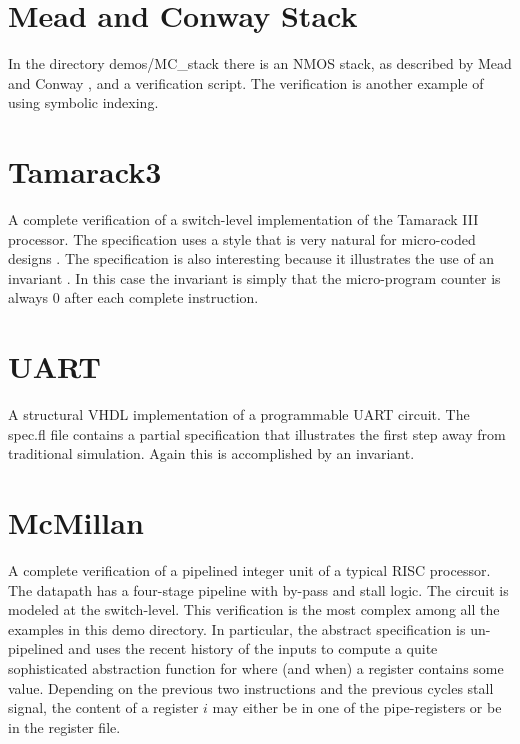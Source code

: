 \section{Mead and Conway Stack}

In the directory demos/MC\_stack there is an NMOS%
%
{} stack, as described
by Mead and Conway%
%
{}, and a verification script.
The verification is another example of using symbolic indexing.

\section{Tamarack3}

A complete verification of a switch-level implementation of the
Tamarack III%
%
{} processor.
The specification uses a style that is very natural
for micro-coded designs%
%
{}.
The specification is also interesting because it illustrates
the use of an invariant%
%
{}.
In this case the invariant is simply that the micro-program counter
is always 0 after each complete instruction.

\section{UART}

A structural VHDL implementation of a programmable UART%
%
{} circuit.
The spec.fl file contains a partial specification that illustrates
the first step away from traditional simulation.
Again this is accomplished by an invariant. 

\section{McMillan}

A complete verification of a pipelined%
%
{} integer unit of a typical
RISC processor.
The datapath has a four-stage pipeline with by-pass and stall logic.
The circuit is modeled at the switch-level.
This verification is the most complex among all the examples
in this demo directory.
In particular, the abstract specification is un-pipelined and uses
the recent history of the inputs to compute a quite sophisticated
abstraction function%
%
{} for where (and when) a register contains some
value.
Depending on the previous two instructions and the
previous cycles stall signal, the content of a register $i$ may either
be in one of the pipe-registers or be in the register file.

